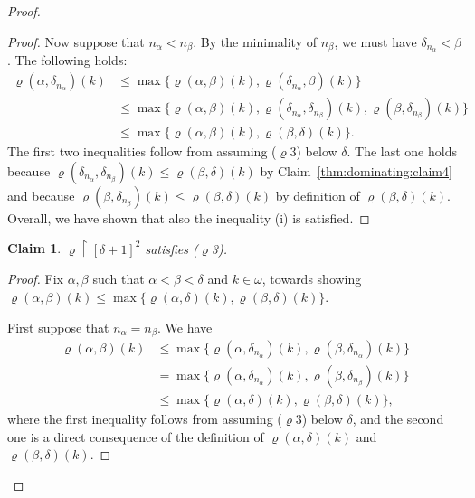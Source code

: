 \documentclass[]{amsart}
\newtheorem{claim}{Claim}[theorem]
\theoremstyle{definition}
\theoremstyle{remark}
\begin{document}
\begin{proof}
\begin{proof}
Now suppose that $n_\alpha < n_\beta$. By the minimality of $n_\beta$, we must have $\delta_{n_\alpha} < \beta$. The following holds:
\begin{align*}
\varrho(\alpha, \delta_{n_\alpha})(k) &\le \max \{\varrho(\alpha, \beta)(k), \varrho(\delta_{n_\alpha}, \beta)(k)\}\\& \le \max \{\varrho(\alpha, \beta)(k), \varrho(\delta_{n_\alpha}, \delta_{n_\beta})(k), \varrho(\beta, \delta_{n_\beta})(k)\}\\&\le \max\{\varrho(\alpha, \beta)(k), \varrho(\beta, \delta)(k)\}.
\end{align*}
The first two inequalities follow from assuming ($\varrho$3) below $\delta$. The last one holds because $\varrho(\delta_{n_\alpha}, \delta_{n_\beta})(k) \le \varrho(\beta, \delta)(k)$ by Claim~\ref{thm:dominating:claim4} and because $\varrho(\beta, \delta_{n_\beta})(k) \le \varrho(\beta, \delta)(k)$ by definition of $\varrho(\beta, \delta)(k)$.  Overall, we have shown that also the inequality (i) is satisfied.
\end{proof}

\begin{claim}
$\varrho \upharpoonright [\delta + 1]^2$ satisfies {\upshape ($\varrho$3)}.
\end{claim}
\begin{proof}
Fix $\alpha, \beta$ such that $\alpha < \beta < \delta$ and $k \in \omega$, towards showing $\varrho(\alpha, \beta)(k) \le \max\{\varrho(\alpha, \delta)(k) , \varrho(\beta, \delta)(k)\}$.

First suppose that $n_\alpha = n_\beta$. We have
\begin{align*}
\varrho(\alpha, \beta)(k) &\le  \max \{\varrho(\alpha, \delta_{n_\alpha})(k), \varrho(\beta, \delta_{n_\alpha})(k)\}\\ &=  \max \{\varrho(\alpha, \delta_{n_\alpha})(k), \varrho(\beta, \delta_{n_\beta})(k)\}\\&\le \max\{\varrho(\alpha, \delta)(k) , \varrho(\beta, \delta)(k)\},
\end{align*}
where the first inequality follows from assuming ($\varrho$3) below $\delta$, and the second one is a direct consequence of the definition of $\varrho(\alpha, \delta)(k)$ and $\varrho(\beta, \delta)(k)$. 


\end{proof}
\end{proof}
\end{document}

